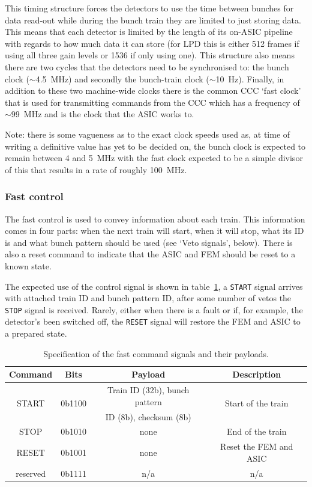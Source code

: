 This timing structure forces the detectors to use the time between bunches for data read-out while during the bunch train they are limited to just storing data. This means that each detector is limited by the length of its on-ASIC pipeline with regards to how much data it can store (for LPD this is either 512 frames if using all three gain levels or 1536 if only using one). This structure also means there are two cycles that the detectors need to be synchronised to: the bunch clock (\(\sim\)4.5~MHz) and secondly the bunch-train clock (\(\sim\)10~Hz). Finally, in addition to these two machine-wide clocks there is the common CCC `fast clock' that is used for transmitting commands from the CCC which has a frequency of \(\sim\)99~MHz and is the clock that the ASIC works to.

Note: there is some vagueness as to the exact clock speeds used as, at time of writing a definitive value has yet to be decided on, the bunch clock is expected to remain between 4 and 5~MHz with the fast clock expected to be a simple divisor of this that results in a rate of roughly 100~MHz. 
\subsubsection{Fast control} %
\label{sub:control_signal}
The fast control is used to convey information about each train. This information comes in four parts: when the next train will start, when it will stop, what its ID is and what bunch pattern should be used (see `Veto signals', below). There is also a reset command to indicate that the ASIC and FEM should be reset to a known state. 

The expected use of the control signal is shown in table~\ref{tab:fast_commands}, a \texttt{START} signal arrives with attached train ID and bunch pattern ID, after some number of vetos the \texttt{STOP} signal is received. Rarely, either when there is a fault or if, for example, the detector's been switched off, the \texttt{RESET} signal will restore the FEM and ASIC to a prepared state.
\begin{table}[htbp]
  \begin{center}
  \begin{tabular}{c | c | c | c}
    Command  & Bits   & Payload & Description \\
    \hline   
    \multirow{2}{*}{START}    
             & \multirow{2}{*}{0b1100}
                      & Train ID (32b), bunch pattern  & \multirow{2}{*}{Start of the train} \\
             &        & ID (8b), checksum (8b)         & \\
    STOP     & 0b1010 & none                           & End of the train \\
    RESET    & 0b1001 & none                           & Reset the FEM and ASIC \\
    reserved & 0b1111 & n/a                            & n/a\\
  \end{tabular}
  \end{center}
  \caption{Specification of the fast command signals and their payloads.}
  \label{tab:fast_commands}
\end{table}
